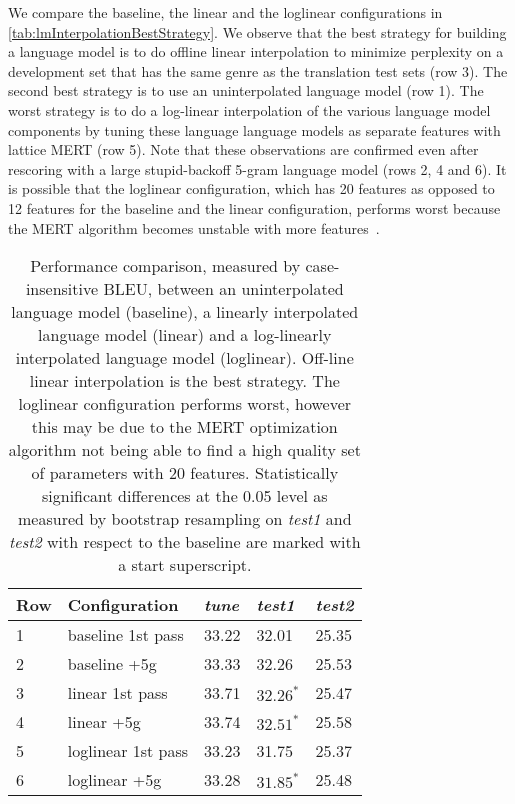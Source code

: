 We compare the baseline, the linear and the loglinear configurations
in \autoref{tab:lmInterpolationBestStrategy}.
We observe that the best strategy for
building a language model is to do offline linear interpolation to minimize
perplexity on a development set that has the same genre as the translation
test sets (row 3). The second best strategy is to use an uninterpolated
language model (row 1). The worst strategy is to do a log-linear interpolation
of the various language model components by tuning these language
language models as separate features with lattice MERT (row 5). Note that
these observations are confirmed even after rescoring with a large
stupid-backoff 5-gram language model (rows 2, 4 and 6).
It is possible that the loglinear configuration, which has 20 features as opposed
to 12 features for the baseline and the linear configuration, performs worst because
the MERT algorithm
becomes unstable with more features~\citep{foster-kuhn:2009:WMT}.
%
\begin{table}
  \begin{center}
    \begin{tabular}{l|l|lll}
      Row & Configuration & \emph{tune} & \emph{test1} & \emph{test2} \\
      \hline
      1 & baseline 1st pass & 33.22 & 32.01 & 25.35 \\
      2 & baseline +5g & 33.33 & 32.26 & 25.53 \\
      \hline
      3 & linear 1st pass & 33.71 & $32.26^*$ & 25.47 \\
      4 & linear +5g & 33.74 & $32.51^*$ & 25.58 \\
      \hline
      5 & loglinear 1st pass & 33.23 & 31.75 & 25.37 \\
      6 & loglinear +5g & 33.28 & $31.85^*$ & 25.48
    \end{tabular}
    \caption{Performance comparison, measured by case-insensitive BLEU, between an uninterpolated language model (baseline), a
    linearly interpolated language model (linear) and a log-linearly interpolated language model (loglinear).
    Off-line linear interpolation is the best strategy. The loglinear configuration performs worst, however this
    may be due to the MERT optimization algorithm not being able to find a high quality
    set of parameters with 20 features. Statistically significant differences at the
    0.05 level as measured by bootstrap resampling on \emph{test1} and \emph{test2}
    with respect to the baseline are marked with a start superscript.}
    \label{tab:lmInterpolationBestStrategy}
  \end{center}
\end{table}
%

